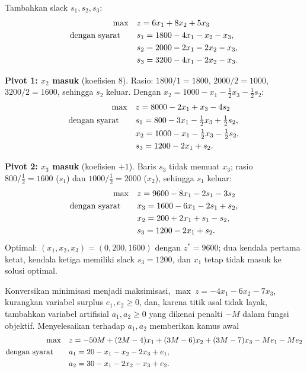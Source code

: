 
Tambahkan slack $s_1, s_2, s_3$:
\[
\begin{aligned}
\max\quad & z = 6x_1 + 8x_2 + 5x_3 \\
\mbox{dengan syarat}\quad\quad & s_1 = 1800 - 4x_1 - x_2 - x_3, \\
& s_2 = 2000 - 2x_1 - 2x_2 - x_3, \\
& s_3 = 3200 - 4x_1 - 2x_2 - x_3.
\end{aligned}
\]

\textbf{Pivot 1: $x_2$ masuk} (koefisien $8$). Rasio:
$1800/1 = 1800$, $2000/2 = 1000$, $3200/2 = 1600$, sehingga $s_2$ keluar. Dengan
$x_2 = 1000 - x_1 - \tfrac12 x_3 - \tfrac12 s_2$:
\[
\begin{aligned}
\max\quad & z = 8000 - 2x_1 + x_3 - 4s_2 \\
\mbox{dengan syarat}\quad\quad & s_1 = 800 - 3x_1 - \tfrac12 x_3 + \tfrac12 s_2, \\
& x_2 = 1000 - x_1 - \tfrac12 x_3 - \tfrac12 s_2, \\
& s_3 = 1200 - 2x_1 + s_2.
\end{aligned}
\]

\textbf{Pivot 2: $x_3$ masuk} (koefisien $+1$). Baris $s_3$ tidak
memuat $x_3$; rasio $800/\tfrac12 = 1600$ ($s_1$) dan
$1000/\tfrac12 = 2000$ ($x_2$), sehingga $s_1$ keluar:
\[
\begin{aligned}
\max\quad & z = 9600 - 8x_1 - 2s_1 - 3s_2 \\
\mbox{dengan syarat}\quad\quad & x_3 = 1600 - 6x_1 - 2s_1 + s_2, \\
& x_2 = 200 + 2x_1 + s_1 - s_2, \\
& s_3 = 1200 - 2x_1 + s_2.
\end{aligned}
\]
Optimal: $(x_1, x_2, x_3) = (0, 200, 1600)$ dengan $z^* = 9600$; dua
kendala pertama ketat, kendala ketiga memiliki slack $s_3 = 1200$, dan $x_1$
tetap tidak masuk ke solusi optimal.


Konversikan minimisasi menjadi maksimisasi, $\max\ z = -4x_1 - 6x_2 - 7x_3$,
kurangkan variabel surplus $e_1, e_2 \geq 0$, dan, karena titik asal
tidak layak, tambahkan variabel artifisial $a_1, a_2 \geq 0$ yang dikenai penalti $-M$
dalam fungsi objektif. Menyelesaikan terhadap $a_1, a_2$ memberikan kamus awal
\[
\begin{aligned}
\max\quad & z = -50M + (2M - 4)x_1 + (3M - 6)x_2 + (3M - 7)x_3 - M e_1 - M e_2 \\
\mbox{dengan syarat}\quad\quad & a_1 = 20 - x_1 - x_2 - 2x_3 + e_1, \\
& a_2 = 30 - x_1 - 2x_2 - x_3 + e_2.
\end{aligned}
\]

